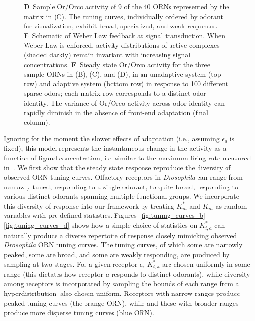 \begin{figure}[!tb]
{{		\textbf{D}~Sample Or/Orco activity of 9 of the 40 ORNs represented by the matrix in (C). The tuning curves, individually ordered by odorant for visualization, exhibit broad, specialized, and weak responses. 
		\textbf{E}~Schematic of Weber Law feedback at signal transduction. When Weber Law is enforced, activity distributions of active complexes (shaded darkly) remain invariant with increasing signal concentrations. 
		\textbf{F}~Steady state Or/Orco activity for the three sample ORNs in (B), (C), and (D), in an unadaptive system (top row) and adaptive system (bottom row) in response to 100 different sparse odors; each matrix row corresponds to a distinct odor identity. The variance of Or/Orco activity across odor identity can rapidly diminish in the absence of front-end adaptation (final column).
		}}
	\label{fig:tuning_curves}
\end{figure}

Ignoring for the moment the slower effects of adaptation (i.e., assuming $\epsilon_a$ is fixed), this model represents the instantaneous change in the activity as a function of ligand concentration, i.e. similar to the maximum firing rate measured in~\cite{hallem_carlson}. We first show that the steady state response reproduce the diversity of observed ORN tuning curves. Olfactory receptors in \textit{Drosophila} can range from narrowly tuned, responding to a single odorant, to quite broad, responding to various distinct odorants spanning multiple functional groups. We incorporate this diversity of response into our framework by treating $K^*_{ia}$ and $K_{ia}$ as random variables with pre-defined statistics. Figures~\ref{fig:tuning_curves_b}-\ref{fig:tuning_curves_d} shows how a simple choice of statistics on $K^*_{i, a}$ can naturally produce a diverse repertoire of response closely mimicking observed \textit{Drosophila} ORN tuning curves. The tuning curves, of which some are narrowly peaked, some are broad, and some are weakly responding, are produced by sampling at two stages. For a given receptor $a$, $K^*_{i,a}$ are chosen uniformly in some range (this dictates how receptor $a$ responds to distinct odorants), while diversity among receptors is incorporated by sampling the bounds of each range from a hyperdistribution, also chosen uniform. Receptors with narrow ranges produce peaked tuning curves (the orange ORN), while and those with broader ranges produce more disperse tuning curves (blue ORN). 


